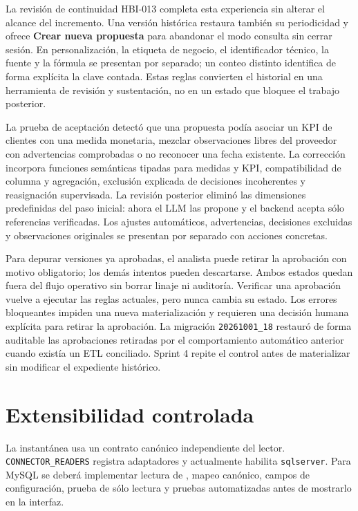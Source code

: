 \documentclass[11pt,letterpaper]{article}
\newcommand{\file}[1]{\texttt{#1}}
\begin{document}
La revisión de continuidad HBI-013 completa esta experiencia sin alterar el alcance del incremento. Una versión histórica restaura también su periodicidad y ofrece \textbf{Crear nueva propuesta} para abandonar el modo consulta sin cerrar sesión. En personalización, la etiqueta de negocio, el identificador técnico, la fuente y la fórmula se presentan por separado; un conteo distinto identifica de forma explícita la clave contada. Estas reglas convierten el historial en una herramienta de revisión y sustentación, no en un estado que bloquee el trabajo posterior.

La prueba de aceptación detectó que una propuesta podía asociar un KPI de clientes con una medida monetaria, mezclar observaciones libres del proveedor con advertencias comprobadas o no reconocer una fecha existente. La corrección incorpora funciones semánticas tipadas para medidas y KPI, compatibilidad de columna y agregación, exclusión explicada de decisiones incoherentes y reasignación supervisada. La revisión posterior eliminó las dimensiones predefinidas del paso inicial: ahora el LLM las propone y el backend acepta sólo referencias verificadas. Los ajustes automáticos, advertencias, decisiones excluidas y observaciones originales se presentan por separado con acciones concretas.

Para depurar versiones ya aprobadas, el analista puede retirar la aprobación con motivo obligatorio; los demás intentos pueden descartarse. Ambos estados quedan fuera del flujo operativo sin borrar linaje ni auditoría. Verificar una aprobación vuelve a ejecutar las reglas actuales, pero nunca cambia su estado. Los errores bloqueantes impiden una nueva materialización y requieren una decisión humana explícita para retirar la aprobación. La migración \file{20261001\_18} restauró de forma auditable las aprobaciones retiradas por el comportamiento automático anterior cuando existía un ETL conciliado. Sprint 4 repite el control antes de materializar sin modificar el expediente histórico.

\section{Extensibilidad controlada}

La instantánea usa un contrato canónico independiente del lector. \file{CONNECTOR\_READERS} registra adaptadores y actualmente habilita \file{sqlserver}. Para MySQL se deberá implementar lectura de , mapeo canónico, campos de configuración, prueba de sólo lectura y pruebas automatizadas antes de mostrarlo en la interfaz.
\end{document}
